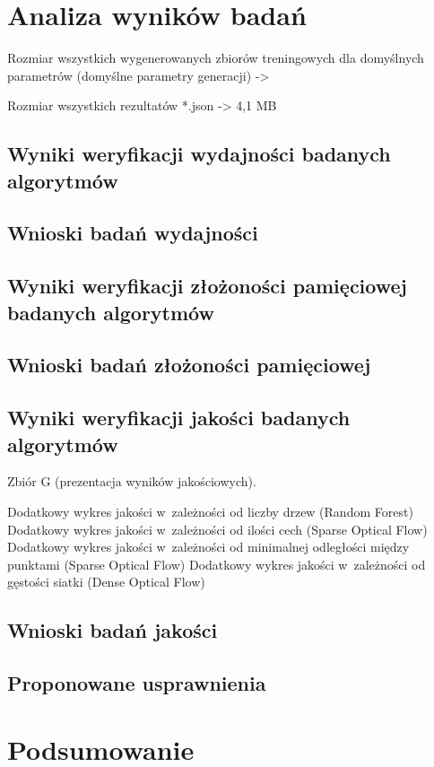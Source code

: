 \chapter{Analiza wyników badań}\label{Chapter_AnalizaRezultatow}

  Rozmiar wszystkich wygenerowanych zbiorów treningowych dla domyślnych parametrów
    (domyślne parametry generacji) ->

  Rozmiar wszystkich rezultatów *.json -> 4,1 MB

  \section{Wyniki weryfikacji wydajności badanych algorytmów}\label{Section_Performance}

  \section{Wnioski badań wydajności}\label{Section_PerformanceWnioski}

  \section{Wyniki weryfikacji złożoności pamięciowej badanych algorytmów}\label{Section_MemoryPerformance}

  \section{Wnioski badań złożoności pamięciowej}\label{Section_MemoryPerformanceWnioski}

  \section{Wyniki weryfikacji jakości badanych algorytmów}\label{Section_Quality}

  Zbiór G (prezentacja wyników jakościowych).

  Dodatkowy wykres jakości w~zależności od liczby drzew (Random Forest)
  Dodatkowy wykres jakości w~zależności od ilości cech (Sparse Optical Flow)
  Dodatkowy wykres jakości w~zależności od minimalnej odległości między punktami (Sparse Optical Flow)
  Dodatkowy wykres jakości w~zależności od gęstości siatki (Dense Optical Flow)

  \section{Wnioski badań jakości}\label{Section_QualityWnioski}

  \section{Proponowane usprawnienia}\label{Section_Usprawnienia}

\chapter{Podsumowanie}\label{Section_Podsumowanie}